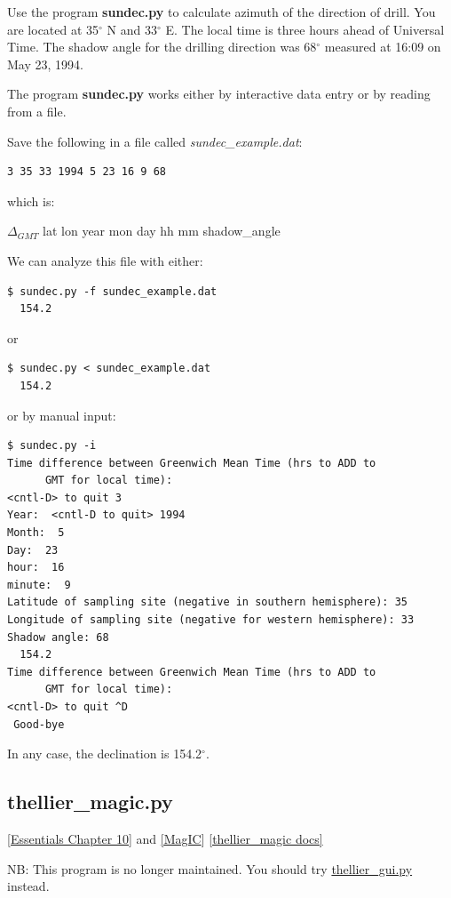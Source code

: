 \documentclass[11pt]{book}
\begin{document}
{{{Use the program {\bf sundec.py} to calculate
azimuth of the direction of drill. You are located at 35$^{\circ}$ N and 33$^{\circ}$ E.  The local
time is three hours ahead of Universal Time.  The shadow angle for the
drilling direction was 68$^{\circ}$ measured at 16:09 on May 23, 1994.

The program {\bf sundec.py}  works either by interactive data entry or by reading from a file.

Save the following in a file called {\it sundec\_example.dat}:

\begin{verbatim}
3 35 33 1994 5 23 16 9 68
\end{verbatim}
which is:

$\Delta_{GMT}$ lat lon year mon day hh mm shadow\_angle

We can analyze this file with either:

\begin{verbatim}
$ sundec.py -f sundec_example.dat
  154.2
\end{verbatim}
or
\begin{verbatim}
$ sundec.py < sundec_example.dat
  154.2
\end{verbatim}
or by manual input:
\begin{verbatim}
$ sundec.py -i
Time difference between Greenwich Mean Time (hrs to ADD to
      GMT for local time):
<cntl-D> to quit 3
Year:  <cntl-D to quit> 1994
Month:  5
Day:  23
hour:  16
minute:  9
Latitude of sampling site (negative in southern hemisphere): 35
Longitude of sampling site (negative for western hemisphere): 33
Shadow angle: 68
  154.2
Time difference between Greenwich Mean Time (hrs to ADD to
      GMT for local time):
<cntl-D> to quit ^D
 Good-bye

\end{verbatim}

In any case, the declination is 154.2$^{\circ}$.


\subsection{thellier\_magic.py}
\href{http://earthref.org/MAGIC/books/Tauxe/Essentials/WebBook3ch10.html#ch10}{ [Essentials Chapter 10]} and \href{#MagIC}{[MagIC}]
\href{https://github.com/PmagPy/PmagPy/blob/master/programs/thellier_magic.py}{[thellier\_magic docs]}

NB:  This program is no longer maintained.  You should try \href{#thellier_GUI.py}{thellier\_gui.py} instead.

}}}
\end{document}
